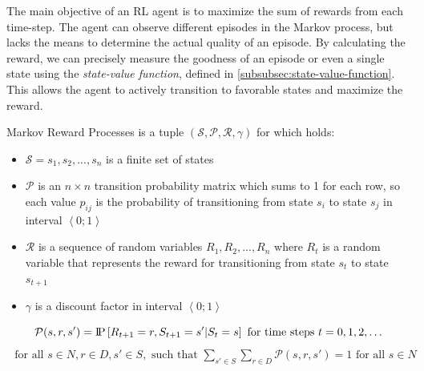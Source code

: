 \documentclass[../xlapes02]{subfiles}
\begin{document}
    The main objective of an RL agent is to maximize the sum of rewards from each time-step. The agent can observe different episodes in the Markov process, but lacks the means to determine the actual quality of an episode. By calculating the reward, we can precisely measure the goodness of an episode or even a single state using the \emph{state-value function}, defined in \cref{subsubsec:state-value-function}. This allows the agent to actively transition to favorable states and maximize the reward.



    \begin{definition}
        Markov Reward Processes is a tuple $(\mathcal{S}, \mathcal{P}, \mathcal{R}, \gamma)$ for which holds:\cite{rao2022foundations}
        \begin{itemize}
            \item $\mathcal{S} = s_1, s_2, ..., s_n$ is a finite set of states
            \item $\mathcal{P}$ is an $n\times n$ transition probability matrix which sums to 1 for each row, so each value $p_{ij}$ is the probability of transitioning from state $s_i$ to state $s_j$ in interval $\left< 0;1 \right>$
            \item $\mathcal{R}$ is a sequence of random variables $R_1, R_2, ..., R_n$ where $R_t$ is a random variable that represents the reward for transitioning from state $s_t$ to state $s_{t+1}$
            \item $\gamma$ is a discount factor in interval $\left< 0;1 \right>$
        \end{itemize}
        \begin{equation}
            \mathcal{P}(s,r,s') = \text{I\kern-0.15em P}\left[ R_{t+1} = r, S_{t+1} = s' | S_t = s \right] \text{ for time steps } t = 0, 1, 2, \ldots
        \end{equation}
        \begin{align*}
            \text{ for all } s \in N, r \in D, s' \in S, \text{ such that } \sum_{s' \in S} \sum_{r \in D} \mathcal{P}(s,r,s') = 1 \text{ for all } s \in N
        \end{align*}
    \end{definition}
\end{document}
